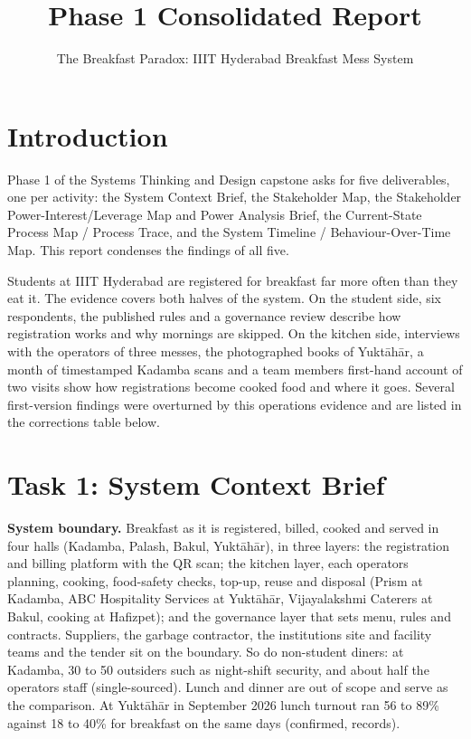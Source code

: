 \documentclass[
  10pt,
  table]{article}
\title{Phase 1 Consolidated Report}
\subtitle{The Breakfast Paradox: IIIT Hyderabad Breakfast Mess System}
\author{}
\date{}
\makeatletter
\gdef\psubtitle{}
\renewcommand{\maketitle}{%
  \begingroup\raggedright
  {\color{pblue}\fontsize{24}{27}\selectfont\bfseries \@title\par}
  \vspace{3pt}{\color{pblue}\rule{\linewidth}{2.4pt}}\par\vspace{5pt}
  {\color{pslate}\large \psubtitle\par}
  \vspace{4pt}
  \endgroup}
\makeatother
\begin{document}
\maketitle

\renewcommand*\contentsname{Contents}
{
\hypersetup{linkcolor=pslate}
\setcounter{tocdepth}{2}
\tableofcontents
}
\section{Introduction}\label{introduction}

Phase 1 of the Systems Thinking and Design capstone asks for five deliverables, one per activity: the System Context Brief, the Stakeholder Map, the Stakeholder Power-Interest/Leverage Map and Power Analysis Brief, the Current-State Process Map / Process Trace, and the System Timeline / Behaviour-Over-Time Map. This report condenses the findings of all five.

Students at IIIT Hyderabad are registered for breakfast far more often than they eat it. The evidence covers both halves of the system. On the student side, six respondents, the published rules and a governance review describe how registration works and why mornings are skipped. On the kitchen side, interviews with the operators of three messes, the photographed books of Yuktāhār, a month of timestamped Kadamba scans and a team member\textquotesingle s first-hand account of two visits show how registrations become cooked food and where it goes. Several first-version findings were overturned by this operations evidence and are listed in the corrections table below.

\section{Task 1: System Context Brief}\label{task-1-system-context-brief}

\textbf{System boundary.} Breakfast as it is registered, billed, cooked and served in four halls (Kadamba, Palash, Bakul, Yuktāhār), in three layers: the registration and billing platform with the QR scan; the kitchen layer, each operator\textquotesingle s planning, cooking, food-safety checks, top-up, reuse and disposal (Prism at Kadamba, ABC Hospitality Services at Yuktāhār, Vijayalakshmi Caterers at Bakul, cooking at Hafizpet); and the governance layer that sets menu, rules and contracts. Suppliers, the garbage contractor, the institution\textquotesingle s site and facility teams and the tender sit on the boundary. So do non-student diners: at Kadamba, 30 to 50 outsiders such as night-shift security, and about half the operator\textquotesingle s staff (single-sourced). Lunch and dinner are out of scope and serve as the comparison. At Yuktāhār in September 2026 lunch turnout ran 56 to 89\% against 18 to 40\% for breakfast on the same days (confirmed, records).
\end{document}
